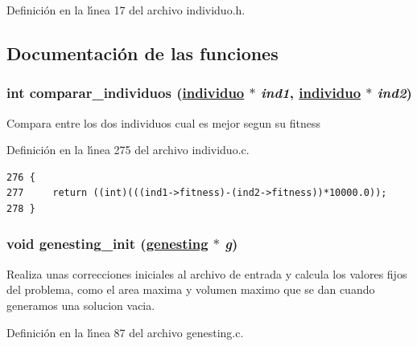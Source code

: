 Definici\'{o}n en la l\'{\i}nea 17 del archivo individuo.h.

\subsection{Documentaci\'{o}n de las funciones}
\hypertarget{group__genetic_gd9507b892f115e76cd4162059839370c_gd9507b892f115e76cd4162059839370c}{
\subsubsection[comparar\_\-individuos]{\setlength{\rightskip}{0pt plus 5cm}int comparar\_\-individuos (\hyperlink{struct__individuo}{individuo} $\ast$ {\em ind1}, \hyperlink{struct__individuo}{individuo} $\ast$ {\em ind2})}}
\label{group__genetic_gd9507b892f115e76cd4162059839370c_gd9507b892f115e76cd4162059839370c}


Compara entre los dos individuos cual es mejor segun su fitness 

Definici\'{o}n en la l\'{\i}nea 275 del archivo individuo.c.

\begin{Code}\begin{verbatim}276 {
277     return ((int)(((ind1->fitness)-(ind2->fitness))*10000.0));
278 }
\end{verbatim}\end{Code}


\hypertarget{group__genetic_g1daa6a4e8af34b8b16a48fc2f3701f1c_g1daa6a4e8af34b8b16a48fc2f3701f1c}{
\subsubsection[genesting\_\-init]{\setlength{\rightskip}{0pt plus 5cm}void genesting\_\-init (\hyperlink{struct__genesting}{genesting} $\ast$ {\em g})}}
\label{group__genetic_g1daa6a4e8af34b8b16a48fc2f3701f1c_g1daa6a4e8af34b8b16a48fc2f3701f1c}


Realiza unas correcciones iniciales al archivo de entrada y calcula los valores fijos del problema, como el area maxima y volumen maximo que se dan cuando generamos una solucion vacia. 

Definici\'{o}n en la l\'{\i}nea 87 del archivo genesting.c.

